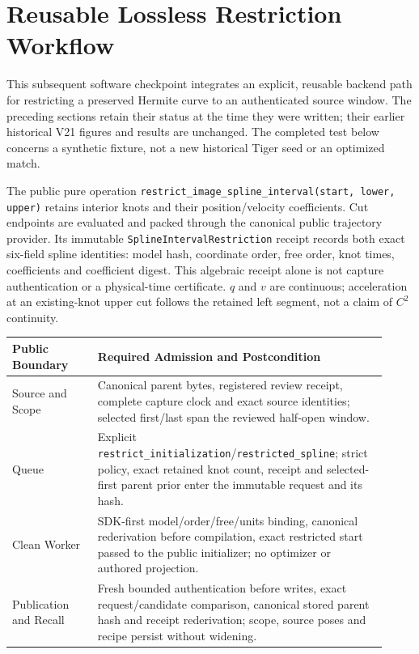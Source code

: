 \documentclass[11pt]{article}
\begin{document}
\newpage
\section*{Reusable Lossless Restriction Workflow}
This subsequent software checkpoint integrates an explicit, reusable backend
path for restricting a preserved Hermite curve to an authenticated source
window. The preceding sections retain their status at the time they were
written; their earlier historical V21 figures and results are unchanged.
The completed test below concerns a synthetic fixture, not a new historical
Tiger seed or an optimized match.

The public pure operation \texttt{restrict\_image\_spline\_interval(start, lower,
upper)} retains interior knots and their position/velocity coefficients. Cut
endpoints are evaluated and packed through the canonical public trajectory
provider. Its immutable \texttt{SplineIntervalRestriction} receipt records
both exact six-field spline identities: model hash, coordinate order, free
order, knot times, coefficients and coefficient digest. This algebraic receipt
alone is not capture authentication or a physical-time certificate. $q$ and $v$
are continuous; acceleration at an existing-knot upper cut follows the retained
left segment, not a claim of $C^2$ continuity.

\begin{center}\begin{tabular}{p{0.21\linewidth}p{0.71\linewidth}}\toprule
Public Boundary & Required Admission and Postcondition\\\midrule
Source and Scope & Canonical parent bytes, registered review receipt, complete capture clock
and exact source identities; selected first/last span the reviewed half-open window.\\
Queue & Explicit \texttt{restrict\_initialization}/\texttt{restricted\_spline};
strict policy, exact retained knot count, receipt and selected-first parent prior
enter the immutable request and its hash.\\
Clean Worker & SDK-first model/order/free/units binding, canonical rederivation before
compilation, exact restricted start passed to the public initializer; no optimizer
or authored projection.\\
Publication and Recall & Fresh bounded authentication before writes, exact request/candidate
comparison, canonical stored parent hash and receipt rederivation; scope, source
poses and recipe persist without widening.\\\bottomrule
\end{tabular}\end{center}
\end{document}
